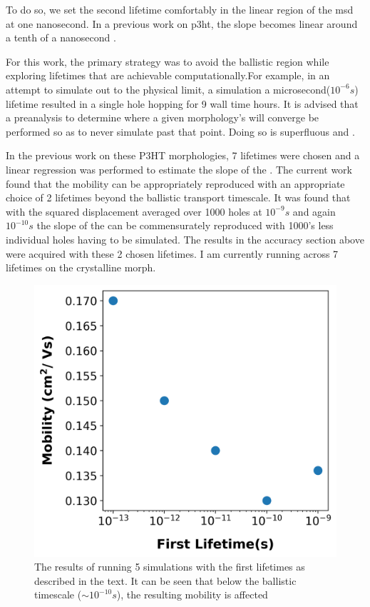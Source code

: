 To do so, we set the second lifetime comfortably in the linear region of the
\gls{msd} at one nanosecond. 
In a previous work on \gls{p3ht}, the slope becomes linear around a tenth of a
nanosecond \cite{jones2017}. 

For this work, the primary strategy was to avoid the ballistic region while exploring lifetimes
that are achievable computationally.For example, in an attempt to simulate out to the physical limit, a
simulation a microsecond($10^{-6}s$) lifetime resulted in a single hole hopping for 9 wall time hours.
It is advised that a preanalysis to determine where a given morphology's  will converge be performed so as
to never simulate past that point. Doing so is superfluous and . 

In the previous work on these P3HT morphologies, 7 lifetimes were chosen and a linear regression was performed
to estimate the slope of the . The current work found that the mobility can be appropriately reproduced
with an appropriate choice of 2 lifetimes beyond the ballistic transport timescale. It was found that with the 
squared displacement averaged over 1000 holes at $10^{-9}s$ and again $10^{-10}s$ the slope of the  can be
commensurately reproduced with 1000's less individual holes having to be simulated. The results in the accuracy
section above were acquired with these 2 chosen lifetimes. I am currently running across 7 lifetimes on the
crystalline morph. 

\begin{figure}
  \center
  \includegraphics[width=0.6\linewidth]{figures/lifetime.png} 
    \caption{The results of running 5  simulations with the first lifetimes as described in the text. It
    can be seen that below the ballistic timescale (${\sim}10^{-10}s$), the resulting mobility is affected}
  \label{lifetime}
\end{figure}


